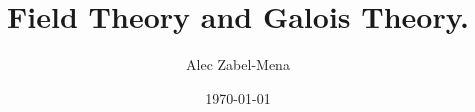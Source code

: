 \documentclass[12pt, twoside]{book}
\title{Field Theory and Galois Theory.}
\author{Alec Zabel-Mena}
\date{\today}
\begin{document}
\maketitle
\tableofcontents
\newpage



%

\nocite{*}



\end{document}

